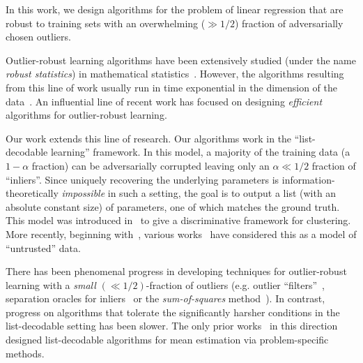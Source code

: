 

In this work, we design algorithms for the problem of linear regression that are robust to training sets with an overwhelming ($\gg 1/2$) fraction of adversarially chosen outliers. 

Outlier-robust learning algorithms have been extensively studied (under the name \emph{robust statistics}) in mathematical statistics~\cite{MR0426989,maronna2006robust,huber2011robust,hampel2011robust}. However, the algorithms resulting from this line of work usually run in time exponential in the dimension of the data~\cite{bernholt2006robust}. An influential line of recent work \cite{journals/jmlr/KlivansLS09,journals/corr/AwasthiBL13, DBLP:journals/corr/DiakonikolasKKL16,DBLP:conf/focs/LaiRV16,DBLP:conf/stoc/CharikarSV17,KothariSteinhardt17,2017KS,HopkinsLi17,DBLP:journals/corr/DiakonikolasKK017a,DBLP:journals/corr/DiakonikolasKS17,DBLP:conf/colt/KlivansKM18} has focused on designing \emph{efficient} algorithms for outlier-robust learning. 

Our work extends this line of research. Our algorithms work in the ``list-decodable learning'' framework. In this model, a majority of the training data (a $1 -\alpha$ fraction) can be adversarially corrupted leaving only an $\alpha \ll 1/2$ fraction of ``inliers''. Since uniquely recovering the underlying parameters is information-theoretically \emph{impossible} in such a setting, the goal is to output a list (with an absolute constant size) of parameters, one of which matches the ground truth. This model was introduced in~\cite{DBLP:conf/stoc/BalcanBV08} to give a discriminative framework for clustering. More recently, beginning with~\cite{DBLP:conf/stoc/CharikarSV17}, various works~\cite{DBLP:conf/stoc/DiakonikolasKS18,KothariSteinhardt17} have considered this as a model of ``untrusted'' data. 

There has been phenomenal progress in developing techniques for outlier-robust learning with a \emph{small} $(\ll 1/2)$-fraction of outliers (e.g. outlier ``filters''~\cite{DBLP:conf/focs/DiakonikolasKK016,DBLP:journals/corr/DiakonikolasKK017a,DBLP:conf/soda/0002D019,DBLP:conf/soda/DiakonikolasKK018}, separation oracles for inliers~\cite{DBLP:conf/focs/DiakonikolasKK016} or the \emph{sum-of-squares} method~\cite{2017KS,HopkinsLi17,KothariSteinhardt17,DBLP:conf/colt/KlivansKM18}). In contrast, progress on algorithms that tolerate the significantly harsher conditions in the list-decodable setting has been slower. The only prior works~\cite{DBLP:conf/stoc/CharikarSV17,DBLP:conf/stoc/DiakonikolasKS18,KothariSteinhardt17} in this direction designed list-decodable algorithms for mean estimation via problem-specific methods. 

